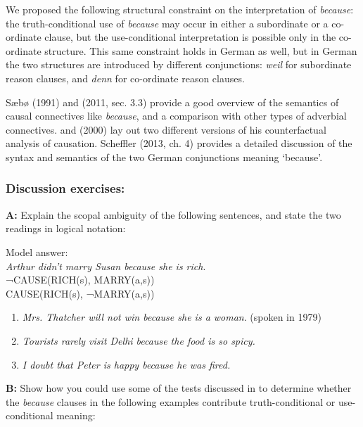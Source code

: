 We proposed the following structural constraint on the interpretation of \textit{because}: the truth-conditional use of \textit{because} may occur in either a subordinate or a co-ordinate clause, but the use-conditional interpretation is possible only in the co-ordinate structure. This same constraint holds in German as well, but in German the two structures are introduced by different conjunctions: \textit{weil} for subordinate reason clauses, and \textit{denn} for co-ordinate reason clauses.



\furtherreading



Sæbø (1991) and (2011, sec. 3.3) provide a good overview of the semantics of causal connectives like \textit{because}, and a comparison with other types of adverbial connectives. \citet{Lewis1973b} and (2000) lay out two different versions of his counterfactual analysis of causation. Scheffler (2013, ch. 4) provides a detailed discussion of the syntax and semantics of the two German conjunctions meaning ‘because’.


\subsubsection{Discussion exercises:}\label{sec:}

\textbf{A:} Explain the scopal ambiguity of the following sentences, and state the two readings in logical notation:

\ea
\textsf{Model answer:}\\
\textsf{\textit{Arthur didn’t marry Susan because she is rich}}\textsf{.}\\
\ea ¬CAUSE(RICH(s), MARRY(a,s))\\
\ex CAUSE(RICH(s), ¬MARRY(a,s))\\
\z \z

\begin{enumerate}
\item 
\textit{Mrs. Thatcher will not win because she is a woman}. (spoken in 1979)
\item \itshape
Tourists rarely visit Delhi because the food is so spicy.
\item 
\textit{I doubt that Peter is happy because he was fired.}
\end{enumerate}

\textbf{B:} Show how you could use some of the tests discussed in  to determine whether the \textit{because} clauses in the following examples contribute truth-conditional or use-conditional meaning:

